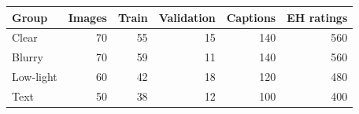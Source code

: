 \begin{tabular}{lrrrrr}
\toprule
Group & Images & Train & Validation & Captions & EH ratings \\
\midrule
Clear & 70 & 55 & 15 & 140 & 560 \\
Blurry & 70 & 59 & 11 & 140 & 560 \\
Low-light & 60 & 42 & 18 & 120 & 480 \\
Text & 50 & 38 & 12 & 100 & 400 \\
\bottomrule
\end{tabular}
